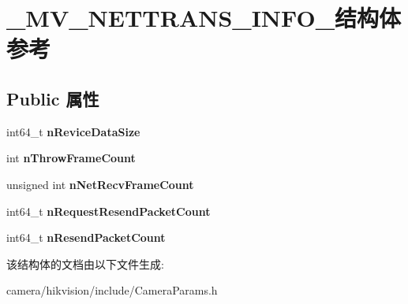 \hypertarget{struct___m_v___n_e_t_t_r_a_n_s___i_n_f_o__}{}\section{\+\_\+\+M\+V\+\_\+\+N\+E\+T\+T\+R\+A\+N\+S\+\_\+\+I\+N\+F\+O\+\_\+结构体 参考}
\label{struct___m_v___n_e_t_t_r_a_n_s___i_n_f_o__}
\subsection*{Public 属性}
\begin{DoxyCompactItemize}
\item 
\mbox{\label{struct___m_v___n_e_t_t_r_a_n_s___i_n_f_o___ad48ccebc2156f26407f0b4783c1d417c}} 
int64\+\_\+t {\bfseries n\+Revice\+Data\+Size}
\item 
\mbox{\label{struct___m_v___n_e_t_t_r_a_n_s___i_n_f_o___a7f0b15c03ddb153e6e76d073d48b006e}} 
int {\bfseries n\+Throw\+Frame\+Count}
\item 
\mbox{\label{struct___m_v___n_e_t_t_r_a_n_s___i_n_f_o___a9f1c2ba3699a884a703f570945d84ad8}} 
unsigned int {\bfseries n\+Net\+Recv\+Frame\+Count}
\item 
\mbox{\label{struct___m_v___n_e_t_t_r_a_n_s___i_n_f_o___a6ffa3c3bb49b970cf5ff4be5a59f1760}} 
int64\+\_\+t {\bfseries n\+Request\+Resend\+Packet\+Count}
\item 
\mbox{\label{struct___m_v___n_e_t_t_r_a_n_s___i_n_f_o___a67bc281073809296b4a38db9630925bb}} 
int64\+\_\+t {\bfseries n\+Resend\+Packet\+Count}
\end{DoxyCompactItemize}


该结构体的文档由以下文件生成\+:\begin{DoxyCompactItemize}
\item 
camera/hikvision/include/Camera\+Params.\+h\end{DoxyCompactItemize}
